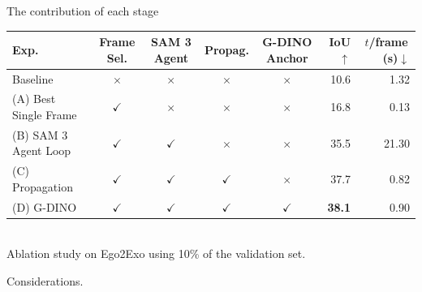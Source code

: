 \documentclass[professionalfonts,aspectratio=169]{beamer}
\begin{document}

\begin{frame}[t]
\begin{center}
{\large The contribution of each stage}
\end{center}
\vfill
\begin{center}
    \footnotesize
    \setlength{\tabcolsep}{5pt}
    \begin{tabular}{lccccrr}
      \toprule
      Exp. & Frame Sel. & SAM 3 Agent & Propag. & G-DINO Anchor & IoU$\uparrow$ & $t$/frame\,(s)$\downarrow$ \\
      \midrule
      Baseline          & $\times$ & $\times$ & $\times$ & $\times$ & 10.6 & 1.32 \\
      \midrule
      (A) Best Single Frame & $\checkmark$ & $\times$ & $\times$ & $\times$ & 16.8 & 0.13 \\
      (B) SAM 3 Agent Loop  & $\checkmark$ & $\checkmark$ & $\times$ & $\times$ & 35.5 & 21.30 \\
      (C) Propagation       & $\checkmark$ & $\checkmark$ & $\checkmark$ & $\times$ & 37.7 & 0.82 \\
      (D) G-DINO            & $\checkmark$ & $\checkmark$ & $\checkmark$ & $\checkmark$ & \textbf{38.1} & 0.90 \\
      \bottomrule
    \end{tabular}
    \\[0.8em]
    {\normalsize Ablation study on Ego2Exo using 10\% of the validation set.}
\end{center}
\vfill
\end{frame}

\begin{frame}
  \begin{center}
      {\Large Considerations.}
  \end{center}
  \end{frame}
\end{document}
